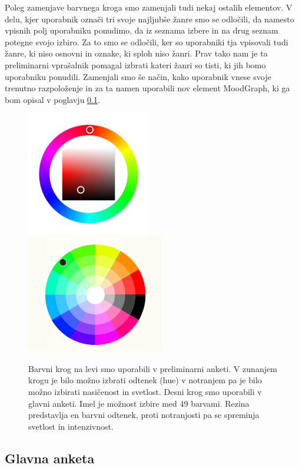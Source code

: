 \documentclass[a4paper, 12pt]{book}
\begin{document}
{Poleg zamenjave barvnega kroga smo zamenjali tudi nekaj ostalih elementov. V delu, kjer uporabnik označi tri svoje najljubše žanre smo se odločili, da namesto vpisnih polj uporabniku ponudimo, da iz seznama izbere in na drug seznam potegne svojo izbiro. Za to smo se odločili, ker so uporabniki tja vpisovali tudi žanre, ki niso osnovni in oznake, ki sploh niso žanri. Prav tako nam je ta preliminarni vprašalnik pomagal izbrati kateri žanri so tisti, ki jih bomo uporabniku ponudili. Zamenjali smo še način, kako uporabnik vnese svoje trenutno razpoloženje in za ta namen uporabili nov element MoodGraph, ki ga bom opisal v poglavju \ref{glavnaanketa}. 

\begin{figure}[ht]
\centering
\includegraphics[width=54mm]{colorwheelold.png}
\includegraphics[width=60mm]{colorwheel.png}

\caption{Barvni krog na levi smo uporabili v preliminarni anketi. V zunanjem krogu je bilo možno izbrati odtenek (hue) v notranjem pa je bilo možno izbirati nasičenost in svetlost. Desni krog smo uporabili v glavni anketi. Imel je možnost izbire med 49 barvami. Rezina predstavlja en barvni odtenek, proti notranjosti pa se spreminja svetlost in intenzivnost. }
\label{colorwheels}
\end{figure}

\subsection{Glavna anketa}
\label{glavnaanketa}

}
\end{document}
